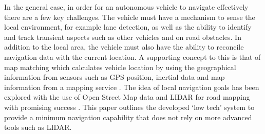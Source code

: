 \documentclass[]{aiaa-tc}%
\begin{document}
In the general case, in order for an autonomous vehicle to navigate effectively there are a few key challenges. The vehicle must have a mechanism to sense the local environment, for example lane detection, as well as the ability to identify and track transient aspects such as other vehicles and on road obstacles. In addition to the local area, the vehicle must also have the ability to reconcile navigation data with the current location. A supporting concept to this is that of map matching which calculates vehicle location by using the geographical information from sensors such as GPS position, inertial data and map information from a mapping service \citep{keyTechSelfDriving}. The idea of local navigation goals has been explored with the use of Open Street Map data and LIDAR for road mapping with promising success \citep{mitLocalNavDriving}. This paper outlines the developed `low tech' system to provide a minimum navigation capability that does not rely on more advanced tools such as LIDAR. 
\end{document}
